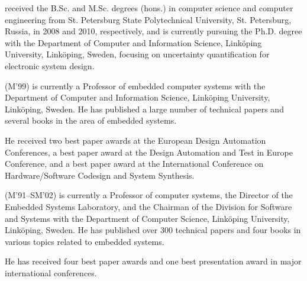 \vspace{0.5em}
 received the B.Sc. and M.Sc. degrees (hons.) in
computer science and computer engineering from St. Petersburg State
Polytechnical University, St. Petersburg, Russia, in 2008 and 2010,
respectively, and is currently pursuing the Ph.D. degree with the Department of
Computer and Information Science, Link\"{o}ping University, Link\"{o}ping,
Sweden, focusing on uncertainty quantification for electronic system design.

\vspace{0.5em}
 (M'99) is currently a Professor of embedded computer
systems with the Department of Computer and Information Science, Link\"{o}ping
University, Link\"{o}ping, Sweden. He has published a large number of technical
papers and several books in the area of embedded systems.

He received two best paper awards at the European Design Automation Conferences,
a best paper award at the Design Automation and Test in Europe Conference, and a
best paper award at the International Conference on Hardware/Software Codesign
and System Synthesis.

\vspace{0.5em}
 (M'91--SM'02) is currently a Professor of computer
systems, the Director of the Embedded Systems Laboratory, and the Chairman of
the Division for Software and Systems with the Department of Computer Science,
Link\"{o}ping University, Link\"{o}ping, Sweden. He has published over 300
technical papers and four books in various topics related to embedded systems.

He has received four best paper awards and one best presentation award in major
international conferences.
